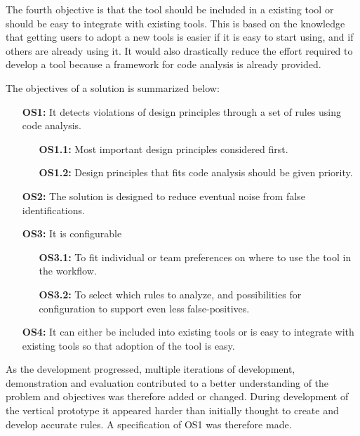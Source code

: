 \documentclass{report}
\begin{document}
The fourth objective is that the tool should be included in a existing tool or should be easy to integrate with existing tools. This is based on the knowledge that getting users to adopt a new tools is easier if it is easy to start using, and if others are already using it. It would also drastically reduce the effort required to develop a tool because a framework for code analysis is already provided. 

The objectives of a solution is summarized below:
\begin{itemize}
    \item [\textbf{OS1:}] It detects violations of design principles through a set of rules using code analysis.
    \begin{itemize}
        \item [\textbf{OS1.1:}] Most important design principles considered first.
        \item [\textbf{OS1.2:}] Design principles that fits code analysis should be given priority.
    \end{itemize}
    \item [\textbf{OS2:}] The solution is designed to reduce eventual noise from false identifications. 
    
    \item [\textbf{OS3:}] It is configurable
    \begin{itemize}
         \item [\textbf{OS3.1:}] To fit individual or team preferences on where to use the tool in the workflow. 
         \item [\textbf{OS3.2:}] To select which rules to analyze, and possibilities for configuration to support even less false-positives.  
    \end{itemize}
    
    \item [\textbf{OS4:}] It can either be included into existing tools or is easy to integrate with existing tools so that adoption of the tool is easy.
\end{itemize}

As the development progressed, multiple iterations of development, demonstration and evaluation contributed to a better understanding of the problem and objectives was   therefore added or changed. During development of the vertical prototype it appeared harder than initially thought to create and develop accurate rules. A specification of OS1 was therefore made. 
\end{document}
